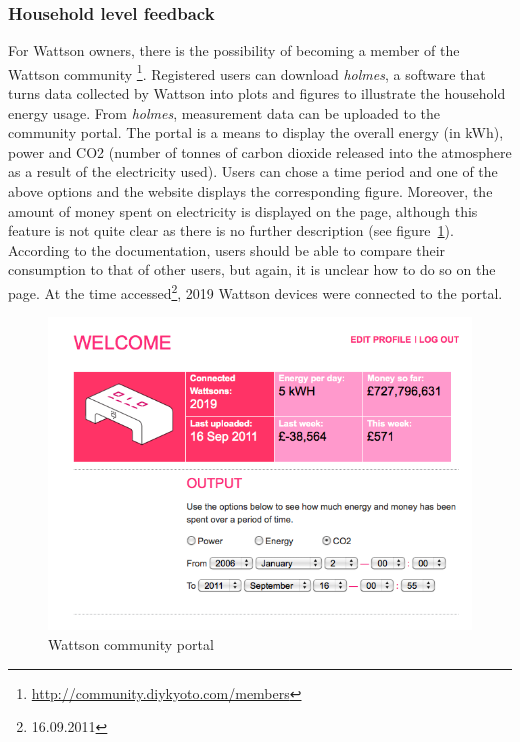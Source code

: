 \subsubsection{Household level feedback}
For Wattson owners, there is the possibility of becoming a member of the Wattson community \footnote{\url{http://community.diykyoto.com/members}}. Registered users can download \textit{holmes}, a software that turns data collected by Wattson into plots and figures to illustrate the household energy usage. From \textit{holmes}, measurement data can be uploaded to the community portal. The portal is a means to display the overall energy (in kWh), power and CO2 (number of tonnes of carbon dioxide released into the atmosphere as a result of the electricity used). Users can chose a time period and one of the above options and the website displays the corresponding figure. Moreover, the amount of money spent on electricity is displayed on the page, although this feature is not quite clear as there is no further description (see figure~\ref{wattson_community}). According to the documentation, users should be able to compare their consumption to that of other users, but again, it is unclear how to do so on the page. At the time accessed\footnote{16.09.2011}, 2019 Wattson devices were connected to the portal. 
\begin{figure}[htbp]
\begin{center}
\includegraphics[width=12cm]{Images/wattson_community.png}
\caption{Wattson community portal}
\label{wattson_community}
\end{center}
\end{figure}

